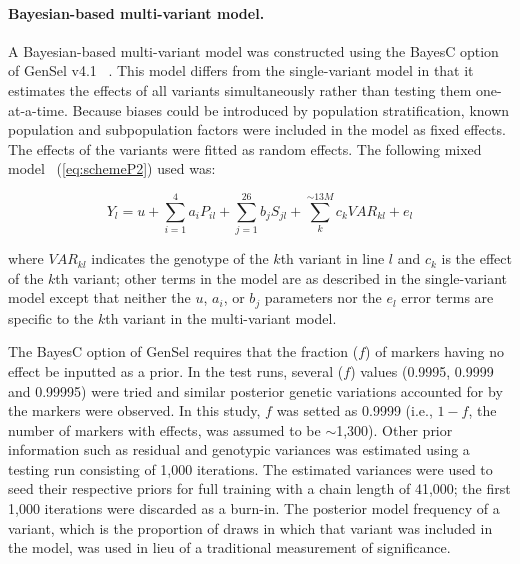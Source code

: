 \documentclass[10pt,letterpaper]{article}
\begin{document}
\paragraph{Bayesian-based multi-variant model.} 
A Bayesian-based multi-variant model was constructed using the BayesC option of GenSel v4.1 ~\cite{Habier2011}. This model differs from the single-variant model in that it estimates the effects of all variants simultaneously rather than testing them one-at-a-time. Because biases could be introduced by population stratification, known population and subpopulation factors were included in the model as fixed effects. The effects of the variants were fitted as random effects. The following mixed model ~(\ref{eq:schemeP2}) used was:  

\begin{equation}\label{eq:schemeP2} 
Y_l = u + \sum_{i=1}^{4}a_{i}P_{il} + \sum_{j=1}^{26} b_{j}S_{jl} + \sum_k^{\sim 13M}c_k VAR_{kl} + e_l
\end{equation}

where $VAR_{kl}$ indicates the genotype of the $k$th variant in line $l$ and $c_k$ is the effect of the $k$th variant; other terms in the model are as described in the single-variant model except that neither the $u$, $a_i$, or $b_j$ parameters nor the $e_l$ error terms are specific to the $k$th variant in the multi-variant model. 

The BayesC option of GenSel requires that the fraction ($f$) of markers having no effect be inputted as a prior. In the test runs, several ($f$) values (0.9995, 0.9999 and 0.99995) were tried and similar posterior genetic variations accounted for by the markers were observed. In this study, $f$ was setted as 0.9999 (i.e., $1 - f$, the number of markers with effects, was assumed to be $\sim$1,300). Other prior information such as residual and genotypic variances was estimated using a testing run consisting of 1,000 iterations. The estimated variances were used to seed their respective priors for full training with a chain length of 41,000; the first 1,000 iterations were discarded as a burn-in. The posterior model frequency of a variant, which is the proportion of draws in which that variant was included in the model, was used in lieu of a traditional measurement of significance.
\end{document}
